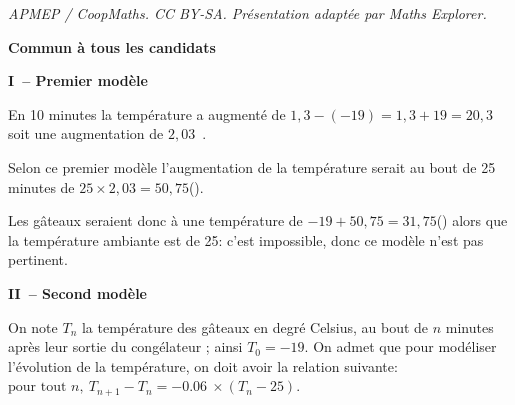 \documentclass[10pt]{article}
\providecommand{\np}[2][]{{#2~#1}}
\begin{document}
\noindent\textit{APMEP / CoopMaths. CC BY-SA. Présentation adaptée par Maths Explorer.}\par\medskip
\textbf{Commun à tous les candidats}








\begin{center}
\textbf{I~-- Premier modèle}
\end{center}




 

En 10 minutes la température a augmenté de $1,3 - ( - 19) = 1,3 + 19 = 20,3$ soit une augmentation de $2,03$~\textcelsius.

Selon ce premier modèle l'augmentation de la  température serait au bout de 25 minutes de $25 \times 2,03 = 50,75$(\textcelsius).

Les gâteaux seraient donc à une température de $- 19 + 50,75 = 31,75$(\textcelsius) alors que la température ambiante est de 25\textcelsius : c'est impossible, donc ce modèle n'est pas pertinent.

\begin{center}
\textbf{II~-- Second modèle}
\end{center}

On note $T_n$ la température des gâteaux  en degré Celsius, au bout de $n$ minutes après leur sortie du congélateur ; ainsi $T_0= - 19$.
  On admet que pour modéliser l'évolution de la température, on doit avoir la relation suivante:
 $\text{pour tout } n,\ T_{n+1}-T_n=-\np{0.06}\times \left(T_n - 25\right).$
\end{document}
